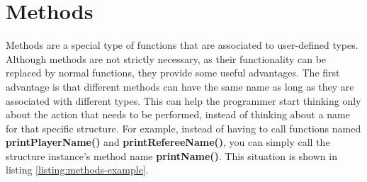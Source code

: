 \documentclass[11pt,fleqn,openany]{book} %
\begin{document}


\section{Methods}


Methods are a special type of functions that are associated to user-defined types. Although methods are not strictly necessary, as their functionality can be replaced by normal functions, they provide some useful advantages. The first advantage is that different methods can have the same name as long as they are associated with different types. This can help the programmer start thinking only about the action that needs to be performed, instead of thinking about a name for that specific structure. For example, instead of having to call functions named \textbf{printPlayerName()} and \textbf{printRefereeName()}, you can simply call the structure instance's method name \textbf{printName()}. This situation is shown in listing \ref{listing:methods-example}.

\end{document}
